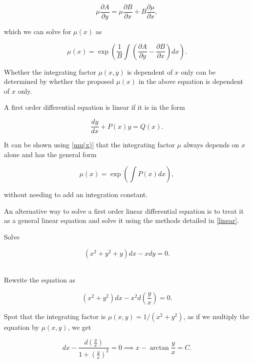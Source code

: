 \documentclass[english,a4paper,12pt]{report}
\begin{document}
\begin{equation}
    \mu \frac{\partial A}{\partial y} = \mu \frac{\partial B}{\partial x} + B \frac{\partial \mu}{\partial x},
\end{equation}

which we can solve for \(\mu (x)\) as

\begin{equation} \label{mu(x)} 
    \mu (x) = \exp \left( \frac{1}{B} \int \left(\frac{\partial A}{\partial y} -\frac{\partial B}{\partial x} \right)dx  \right).
\end{equation}

Whether the integrating factor \(\mu (x,y)\) is dependent of \(x\) only can be determined by whether the proposed \(\mu (x)\) in the above equation is dependent of \(x\) only.  

A first order differential equation is linear if it is in the form

\begin{equation}
    \frac{dy}{dx} + P(x)y = Q(x). 
\end{equation}

It can be shown using \cref{mu(x)} that the integrating factor \(\mu \) always depends on \(x\) alone and has the general form

\begin{equation}
    \mu (x) = \exp \left( \int P(x) dx \right),
\end{equation}

without needing to add an integration constant.

An alternative way to solve a first order linear differential equation is to treat it as a general linear equation and solve it using the methods detailed in \cref{linear}. 

{Solve

\begin{equation}
    (x^2+y^2+y)dx - xdy=  0.
\end{equation}~
}
{Rewrite the equation as

\begin{equation}
    (x^2+y^2)dx-x^2d\left( \frac{y}{x}  \right) = 0.
\end{equation}

Spot that the integrating factor is \( \mu (x,y) = 1 / (x^2+y^2) \), as if we multiply the equation by \(\mu (x,y)\), we get

\begin{equation}
    dx - \frac{d\left( \frac{y}{x}  \right)}{1+(\frac{y}{x} )^2} = 0 \implies x - \arctan {\frac{y}{x} }=C.  
\end{equation}~
} 
\end{document}
